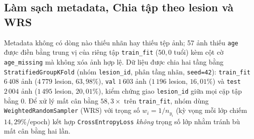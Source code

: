 \documentclass[10pt,twocolumn,a4paper]{article}
\begin{document}
\begin{table}[!t]
\centering
\caption{Bảng kết luận EDA trên toàn bộ $10\,015$ ảnh và đối chiếu sai số ResNet-18 baseline ngoài mẫu (chuẩn hóa theo thành phần lớp, tập test $n=2\,004$, CI95 bootstrap cụm lesion). Mọi thí nghiệm ở mục 2.5 truy ngược trực tiếp về bảng này.}
\label{tab:eda_concl}
\end{table}

\subsection{Làm sạch metadata, Chia tập theo lesion và WRS}
Metadata không có dòng nào thiếu nhãn hay thiếu tệp ảnh; 57 ảnh thiếu \texttt{age} được điền bằng trung vị của riêng tập \texttt{train\_fit} ($50{,}0$ tuổi) kèm cột cờ \texttt{age\_missing} mà không xóa ảnh hợp lệ. Dữ liệu được chia hai tầng bằng \texttt{StratifiedGroupKFold} (nhóm \texttt{lesion\_id}, phân tầng nhãn, \texttt{seed=42}): \texttt{train\_fit} $6\,408$ ảnh ($4\,779$ lesion, $63{,}98\%$), \texttt{val} $1\,603$ ảnh ($1\,196$ lesion, $16{,}01\%$) và \texttt{test} $2\,004$ ảnh ($1\,495$ lesion, $20{,}01\%$), kiểm chứng giao \texttt{lesion\_id} giữa mọi cặp tập bằng $0$. Để xử lý mất cân bằng $58{,}3\times$ trên \texttt{train\_fit}, nhóm dùng \texttt{WeightedRandomSampler} (WRS) với trọng số $w_i = 1/n_{y_i}$ (kỳ vọng mỗi lớp chiếm $14{,}29\%$/epoch) kết hợp \texttt{CrossEntropyLoss} \emph{không} trọng số lớp nhằm tránh bù mất cân bằng hai lần.
\end{document}

